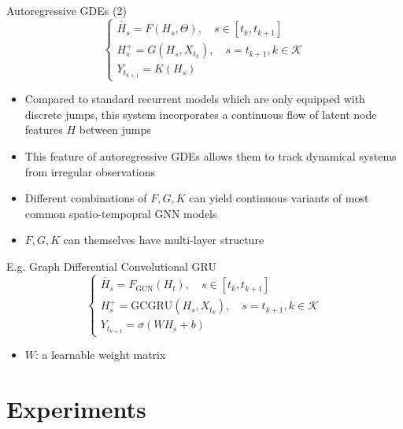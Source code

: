 \documentclass{beamer}
\begin{document}
\begin{frame}{Autoregressive GDEs (2)}
\[
\begin{cases}
\dot{H_s}=F(H_s,\Theta),\quad s\in[t_k,t_{k+1}]\\
H_s^+=G(H_s,X_{t_k}),\quad s=t_{k+1},k\in\mathcal{K}\\
Y_{t_{k+1}}=K(H_s)
\end{cases}
\]
\begin{itemize}
\item Compared to standard recurrent models which are only equipped with discrete jumps, this system incorporates a continuous flow of latent node features $H$ between jumps
\item This feature of autoregressive GDEs allows them to track dynamical systems from irregular observations
\item Different combinations of $F,G,K$ can yield continuous variants of most common spatio-tempopral GNN models
\item $F,G,K$ can themselves have multi-layer structure
\end{itemize}
\end{frame}

\begin{frame}{E.g. Graph Differential Convolutional GRU}
\[
\begin{cases}
\dot{H_s}=F_\text{GCN}(H_t),\quad s\in[t_k,t_{k+1}]\\
H_s^+=\text{GCGRU}(H_s,X_{t_k}),\quad s=t_{k+1},k\in\mathcal{K}\\
Y_{t_{k+1}}=\sigma(WH_s+b)
\end{cases}
\]
\begin{itemize}
\item $W$: a learnable weight matrix
\end{itemize}
\end{frame}


\section{Experiments}
\end{document}
